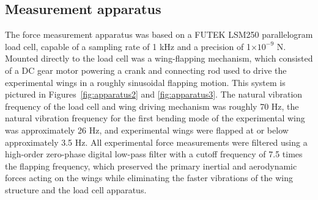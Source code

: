 \documentclass{article}
\providecommand{\e}[1]{\ensuremath{\times 10^{#1}}}
\begin{document}
\subsection*{Measurement apparatus}
The force measurement apparatus was based on a FUTEK LSM250 parallelogram load
cell, capable of a sampling rate of 1 kHz and a precision of 1\e{-9} N.  Mounted
directly to the load cell was a wing-flapping mechanism, which consisted of a DC
gear motor powering a crank and connecting rod used to drive the experimental
wings in a roughly sinusoidal flapping motion. This system is pictured in
Figures~\ref{fig:apparatus2} and \ref{fig:apparatus3}.  The natural vibration
frequency of the load cell and wing driving mechanism was roughly 70 Hz, the
natural vibration frequency for the first bending mode of the experimental wing
was approximately 26 Hz, and experimental wings were flapped at or below
approximately 3.5 Hz.  All experimental force measurements were filtered using a
high-order zero-phase digital low-pass filter with a cutoff frequency of 7.5
times the flapping frequency, which preserved the primary inertial and
aerodynamic forces acting on the wings while eliminating the faster vibrations
of the wing structure and the load cell apparatus.

\end{document}
